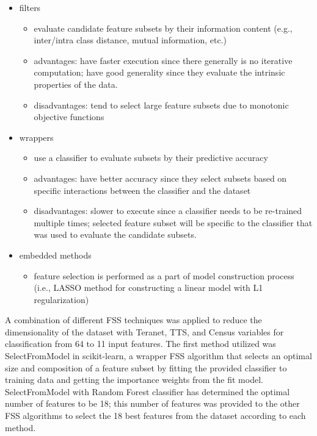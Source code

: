 \begin{itemize}
    \item filters
    \begin{itemize}
        \item evaluate candidate feature subsets by their information content (e.g., inter/intra class distance, mutual information, etc.)
        \item advantages: have faster execution since there generally is no iterative computation;
        have good generality since they evaluate the intrinsic properties of the data.
        \item disadvantages: tend to select large feature subsets due to monotonic objective functions
    \end{itemize}
    \item wrappers
    \begin{itemize}
        \item use a classifier to evaluate subsets by their predictive accuracy
        \item advantages: have better accuracy since they select subsets based on specific interactions between the classifier and the dataset
        \item disadvantages: slower to execute since a classifier needs to be re-trained multiple times;
        selected feature subset will be specific to the classifier that was used to evaluate the candidate subsets.
    \end{itemize}
    \item embedded methods
    \begin{itemize}
        \item feature selection is performed as a part of model construction process (i.e., LASSO method for constructing a linear model with L1 regularization)\cite{Scikit-learndevelopers2019}
    \end{itemize}
\end{itemize}

A combination of different FSS techniques was applied to reduce the dimensionality of the dataset with Teranet, TTS, and Census variables for classification from 64 to 11 input features.
The first method utilized was SelectFromModel in scikit-learn, a wrapper FSS algorithm that selects an optimal size and composition of a feature subset by fitting the provided classifier to training data and getting the importance weights from the fit model.
SelectFromModel with Random Forest classifier has determined the optimal number of features to be 18;
this number of features was provided to the other FSS algorithms to select the 18 best features from the dataset according to each method.

